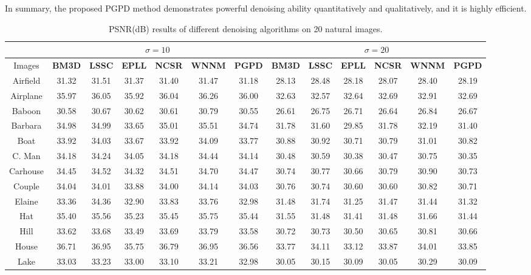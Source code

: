 In summary, the proposed PGPD method demonstrates powerful denoising ability quantitatively and qualitatively, and it is highly efficient.
\begin{table}[t]
\begin{adjustwidth}{-0.5cm}{}
\caption{PSNR(dB) results of different denoising algorithms on 20 natural images.}
\label{tab2-2}
\begin{center}
\renewcommand\arraystretch{1.0}
\scriptsize
\begin{tabular}{|c||c|c|c|c|c|c||c|c|c|c|c|c|}
\hline
&\multicolumn{6}{c||}{ $\sigma = 10$}&\multicolumn{6}{c|}{ $\sigma = 20$}
\\
\hline
\hline
Images&\textbf{BM3D}&\textbf{LSSC}&\textbf{EPLL}&\textbf{NCSR}&\textbf{WNNM}&\textbf{PGPD}
&\textbf{BM3D}&\textbf{LSSC}&\textbf{EPLL}&\textbf{NCSR}&\textbf{WNNM}&\textbf{PGPD} 
\\
\hline
Airfield &31.32&31.51&31.37&31.40 &31.47 &31.18    &28.13&28.48 &28.18&28.07&28.40&28.19 
\\
\hline
Airplane &35.97 &36.05&35.92&36.04&36.26 &36.00  &32.63&32.57 &32.64&32.69&32.91&32.69 
\\
\hline
 Baboon &30.58&30.67&30.62&30.61&30.79&30.55     &26.61&26.75 &26.71&26.64&26.84&26.67
\\
\hline 
 Barbara &34.98&34.99&33.65 &35.01&35.51&34.74    &31.78&31.60 &29.85 &31.78 &32.19&31.40
\\
\hline
 Boat &33.92&34.03 &33.67&33.92&34.09&33.77     &30.88&30.92&30.71&30.79&31.01&30.82
\\
\hline
 C. Man &34.18 &34.24&34.05 &34.18&34.44&34.14      &30.48 &30.59 &30.38 &30.47&30.75&30.35 
\\
\hline
 Carhouse &34.45&34.52&34.32 &34.51&34.70 &34.47   &30.74&30.77&30.66&30.79&30.90&30.73
\\
\hline
 Couple &34.04&34.01&33.88&34.00&34.14&34.03    &30.76 &30.74&30.60&30.60&30.82&30.71 
\\
\hline
 Elaine &33.36 &34.36&32.90&33.83&33.76&32.98    &31.48 &31.74 &31.25&31.47&31.44&31.32
\\
\hline
 Hat &35.40 &35.56&35.23&35.45&35.75&35.44    &31.55 &31.48&31.41&31.48&31.66 &31.44
\\
\hline
 Hill &33.62 &33.68&33.49&33.69&33.79&33.58      &30.72&30.73 &30.50&30.65&30.81&30.66
\\
\hline
 House &36.71 &36.95&35.75&36.79&36.95&36.56     &33.77&34.11 &33.12&33.87&34.01&33.85
\\
\hline
 Lake &33.03 &33.23&33.00&33.10 &33.21&32.98      &30.05&30.15&30.09 &30.05&30.29&30.09

\end{tabular}
\end{center}
\end{adjustwidth}
\end{table}

